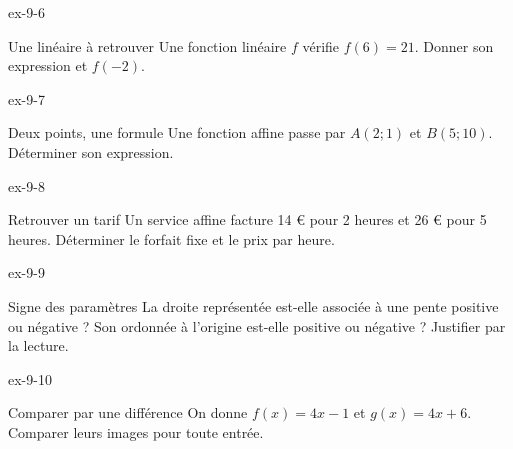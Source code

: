 \clearpage{}
\begin{blocLivre}{ex-9-6}\begin{exercice}[2]{Une linéaire à retrouver}
Une fonction linéaire $f$ vérifie $f(6)=21$. Donner son expression et $f(-2)$.
\end{exercice}\end{blocLivre}
\begin{blocLivre}{ex-9-7}\begin{exercice}[2]{Deux points, une formule}
Une fonction affine passe par $A(2;1)$ et $B(5;10)$. Déterminer son expression.
\label{fig-ex-9-7}
\end{exercice}\end{blocLivre}
\begin{blocLivre}{ex-9-8}\begin{exercice}[2]{Retrouver un tarif}
Un service affine facture 14 € pour 2 heures et 26 € pour 5 heures. Déterminer le forfait fixe et le prix par heure.
\end{exercice}\end{blocLivre}
\begin{blocLivre}{ex-9-9}\begin{exercice}[2]{Signe des paramètres}
La droite représentée est-elle associée à une pente positive ou négative ? Son ordonnée à l’origine est-elle positive ou négative ? Justifier par la lecture.
\label{fig-ex-9-9}
\end{exercice}\end{blocLivre}
\begin{blocLivre}{ex-9-10}\begin{exercice}[2]{Comparer par une différence}
On donne $f(x)=4x-1$ et $g(x)=4x+6$. Comparer leurs images pour toute entrée.
\label{fig-ex-9-10}
\end{exercice}\end{blocLivre}


